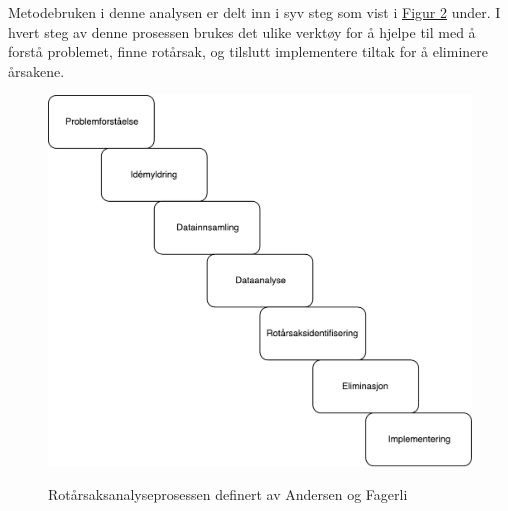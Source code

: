 Metodebruken i denne analysen er delt inn i syv steg som vist i \hyperref[fig:prosess]{Figur 2} under. I hvert steg av denne prosessen brukes det ulike verktøy for å hjelpe til med å forstå problemet, finne rotårsak, og tilslutt implementere tiltak for å eliminere årsakene. 
\begin{figure}[H]
    \centering
    \includegraphics[scale=0.6]{case_1/bilder/prosess.pdf}
    \label{fig:prosess}
    \caption[Rotårsaksanalyseprosessen]{Rotårsaksanalyseprosessen definert av Andersen og Fagerli}
\end{figure}